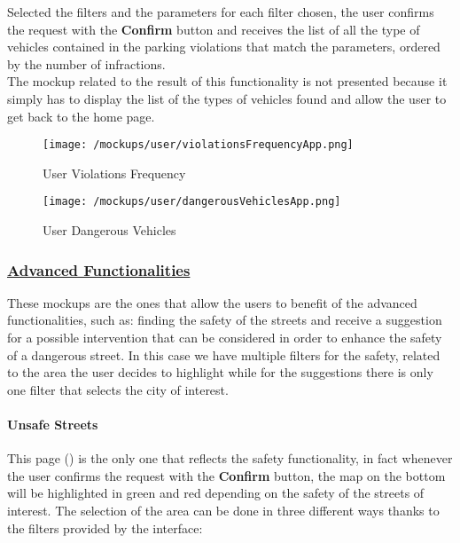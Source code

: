 			Selected the filters and the parameters for each filter chosen, the user confirms the request with the \textbf{Confirm} button and receives the list of all the type of vehicles contained in the parking violations that match the parameters, ordered by the number of infractions.\\
			
			The mockup related to the result of this functionality is not presented because it simply has to display the list of the types of vehicles found and allow the user to get back to the home page.
			
			\vspace{0.6cm}
			
			\begin{figure}[ht!]
				\centering
				\begin{minipage}{0.5\textwidth}
					\centering
					\texttt{[image: /mockups/user/violationsFrequencyApp.png]}
					\caption{\label{fig:violationsFrequencyApp} User Violations Frequency}
				\end{minipage}\hfill
				\begin{minipage}{0.5\textwidth}
					\centering
					\texttt{[image: /mockups/user/dangerousVehiclesApp.png]}
					\caption{\label{fig:dangerousVechiclesApp} User Dangerous Vehicles}
				\end{minipage}
			\end{figure}
		
		\subsubsection[Advanced Functionalities]{\hyperlink{toc}{Advanced Functionalities}}
			\label{sec:userAdvancedFunctionalities}
			
			These mockups are the ones that allow the users to benefit of the advanced functionalities, such as: finding the safety of the streets and receive a suggestion for a possible intervention that can be considered in order to enhance the safety of a dangerous street. In this case we have multiple filters for the safety, related to the area the user decides to highlight while for the suggestions there is only one filter that selects the city of interest.
			
			\paragraph{Unsafe Streets}
			This page () is the only one that reflects the safety functionality, in fact whenever the user confirms the request with the \textbf{Confirm}
			button, the map on the bottom will be highlighted in green and red depending on the safety of the streets of interest. The selection of the area can be done in three different ways thanks to the filters provided by the interface:
			
